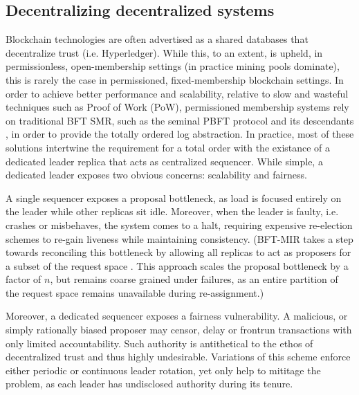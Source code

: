 \subsection{Decentralizing decentralized systems}
Blockchain technologies are often advertised as a shared databases that decentralize trust (i.e. Hyperledger). While this, to an extent, is upheld, in permissionless, open-membership settings (in practice mining pools dominate), this is rarely the case in permissioned, fixed-membership blockchain settings. In order to achieve better performance and scalability, relative to slow and wasteful techniques such as Proof of Work (PoW), permissioned membership systems rely on traditional BFT SMR, such as the seminal PBFT protocol \cite{castro1999practical} and its descendants \cite{castro1999practical, kotla2007zyzzyva,  gueta2018sbft, clement2009making, buchman2016tendermint, yin2019hotstuff}, in order to provide the totally ordered log abstraction.
In practice, most of these solutions intertwine the requirement for a total order with the existance of a dedicated leader replica that acts as centralized sequencer. While simple,  a dedicated leader exposes two obvious concerns: scalability and fairness.

A single sequencer exposes a proposal bottleneck, as load is focused entirely on the leader while other replicas sit idle. Moreover, when the leader is faulty, i.e. crashes or misbehaves, the system comes to a halt, requiring expensive re-election schemes to re-gain liveness while maintaining consistency.  (BFT-MIR takes a step towards reconciling this bottleneck by allowing all replicas to act as proposers for a subset of the request space \cite{stathakopoulou2019mir}. This approach scales the proposal bottleneck by a factor of $n$, but remains coarse grained under failures, as an entire partition of the request space remains unavailable during re-assignment.)

Moreover, a dedicated sequencer exposes a fairness vulnerability. A malicious, or simply rationally biased proposer may censor, delay or frontrun transactions with only limited accountability. Such authority is antithetical to the ethos of decentralized trust and thus highly undesirable. Variations of this scheme enforce either periodic or continuous leader rotation, yet only help to mititage the problem, as each leader has undisclosed authority during its tenure.   


